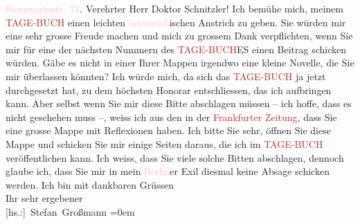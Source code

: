            {\bigskip}\pstart
           \noindent{}\raggedleft{}\textcolor{pink}{Sternwartestr. 71}{}\ledrightnote{\textcolor{pink}{Sternwartestraße}}. \pend
           \pstart\center{}Verehrter Herr Doktor Schnitzler!\pend\pstart
           Ich bemühe mich, meinem \textcolor{brown}{TAGE-BUCH}{}\ledrightnote{\textcolor{brown}{Das Tage-Buch}} einen leichten \textcolor{pink}{österreich}{}\ledrightnote{\textcolor{pink}{Österreich}}ischen Anstrich zu
               geben. Sie würden mir eine sehr grosse Freude machen und mich zu grossem Dank
               verpflichten, wenn Sie mir für eine der nächsten Nummern des \textcolor{brown}{TAGE-BUCH}{}\ledrightnote{\textcolor{brown}{Das Tage-Buch}}ES einen Beitrag schicken würden. Gäbe es nicht in einer Ihrer Mappen irgendwo
               eine kleine Novelle, die Sie mir überlassen könnten? Ich würde mich, da sich das \textcolor{brown}{TAGE-BUCH}{}\ledrightnote{\textcolor{brown}{Das Tage-Buch}} ja jetzt durchgesetzt hat, zu dem höchsten Honorar entschliessen, das ich
               aufbringen kann. Aber selbst wenn Sie mir diese Bitte abschlagen müssen – ich hoffe,
               dass es nicht geschehen muss –, weiss ich aus den \label{K_L02449_1v}\label{K_L02449_1h} in der \textcolor{brown}{Frankfurter Zeitung}{}\ledrightnote{\textcolor{brown}{Frankfurter Zeitung}}, dass Sie eine grosse Mappe mit Reflexionen haben. Ich
               bitte Sie sehr, öffnen Sie diese Mappe und schicken Sie mir einige Seiten daraus, die
               ich im {\pb}\textcolor{brown}{TAGE-BUCH}{}\ledrightnote{\textcolor{brown}{Das Tage-Buch}} veröffentlichen kann. Ich weiss, dass Sie viele solche Bitten abschlagen,
               dennoch glaube ich, dass Sie mir in mein \textcolor{pink}{Berlin}{}\ledrightnote{\textcolor{pink}{Berlin}}er
               Exil diesmal keine Absage schicken werden.\pend
           \pstart
           Ich bin mit dankbaren Grüssen{\\[\baselineskip]}Ihr sehr ergebener{\\[\baselineskip]}\spacefill\mbox{{[}hs.:{]} Stefan Großmann}\pend
           \leftskip=0em{}\endnumbering{}  
      